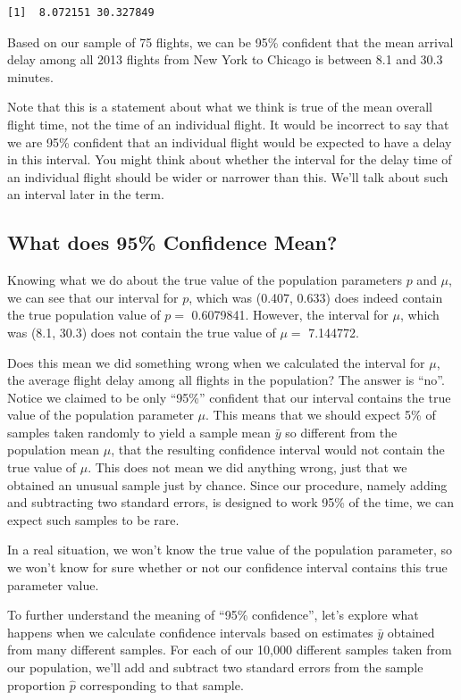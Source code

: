 \documentclass[
  letterpaper,
  DIV=11,
  numbers=noendperiod]{scrreprt}
\begin{document}
\begin{verbatim}
[1]  8.072151 30.327849
\end{verbatim}

Based on our sample of 75 flights, we can be 95\% confident that the
mean arrival delay among all 2013 flights from New York to Chicago is
between 8.1 and 30.3 minutes.

Note that this is a statement about what we think is true of the mean
overall flight time, not the time of an individual flight. It would be
incorrect to say that we are 95\% confident that an individual flight
would be expected to have a delay in this interval. You might think
about whether the interval for the delay time of an individual flight
should be wider or narrower than this. We'll talk about such an interval
later in the term.

\subsection{What does 95\% Confidence
Mean?}\label{what-does-95-confidence-mean}

Knowing what we do about the true value of the population parameters
\(p\) and \(\mu\), we can see that our interval for \(p\), which was
(0.407, 0.633) does indeed contain the true population value of \(p=\)
0.6079841. However, the interval for \(\mu\), which was (8.1, 30.3) does
not contain the true value of \(\mu=\) 7.144772.

Does this mean we did something wrong when we calculated the interval
for \(\mu\), the average flight delay among all flights in the
population? The answer is ``no''. Notice we claimed to be only ``95\%''
confident that our interval contains the true value of the population
parameter \(\mu\). This means that we should expect 5\% of samples taken
randomly to yield a sample mean \(\bar{y}\) so different from the
population mean \(\mu\), that the resulting confidence interval would
not contain the true value of \(\mu\). This does not mean we did
anything wrong, just that we obtained an unusual sample just by chance.
Since our procedure, namely adding and subtracting two standard errors,
is designed to work 95\% of the time, we can expect such samples to be
rare.

In a real situation, we won't know the true value of the population
parameter, so we won't know for sure whether or not our confidence
interval contains this true parameter value.

To further understand the meaning of ``95\% confidence'', let's explore
what happens when we calculate confidence intervals based on estimates
\(\bar{y}\) obtained from many different samples. For each of our 10,000
different samples taken from our population, we'll add and subtract two
standard errors from the sample proportion \(\hat{p}\) corresponding to
that sample.
\end{document}
